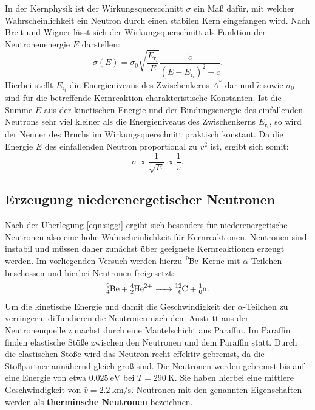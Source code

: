In der Kernphysik ist der Wirkungsquerscchnitt $\sigma$ ein Maß dafür, mit welcher Wahrscheinlichkeit ein Neutron durch einen stabilen Kern eingefangen wird.
Nach Breit und Wigner lässt sich der Wirkungsquerschnitt als Funktion der Neutronenenergie $E$ darstellen:
\begin{equation}
  \sigma (E)=\sigma _0 \sqrt{\frac{E_{\mathrm{r}_i}}{E}}\frac{\tilde{c}}{\left(E-E_{\mathrm{r}_i}\right)^2 +\tilde{c}} \text{.}
\end{equation}
Hierbei stellt $E_{\mathrm{r}_i}$ die Energieniveaus des Zwischenkerns $A^{*}$ dar und $\tilde{c}$ sowie $\sigma_0$ sind für die betreffende Kernreaktion charakteristische Konstanten.
Ist die Summe $E$ aus der kinetischen Energie und der Bindungsenergie des einfallenden Neutrons sehr viel kleiner als die Energieniveaus des Zwischenkerns $E_{\mathrm{r}_i}$, so wird der Nenner des Bruchs im Wirkungsquerschnitt praktisch konstant. Da die Energie $E$ des einfallenden Neutron proportional zu $v^2$ ist, ergibt sich somit:
\begin{equation}
  \label{eqn:siggi}
  \sigma \propto \frac{1}{\sqrt{E}}\propto \frac{1}{v} \text{.}
\end{equation}

\subsection{Erzeugung niederenergetischer Neutronen}
Nach der Überlegung \ref{eqn:siggi} ergibt sich besonders für niederenergetische Neutronen also eine hohe Wahrscheinlichkeit für Kernreaktionen.
Neutronen sind instabil und müssen daher zunächst über geeignete Kernreaktionen erzeugt werden.
Im vorliegenden Versuch werden hierzu $\ce{^{9}Be}$-Kerne mit $\alpha$-Teilchen beschossen und hierbei Neutronen freigesetzt:
\begin{align}
    \ce{ ^{9}_4Be + ^{4}_2He^{2+}  -> ^{12}_6C + ^{1}_0n}\text{.}
\end{align}
Um die kinetische Energie und damit die Geschwindigkeit der $\alpha$-Teilchen zu verringern, diffundieren die Neutronen nach dem Austritt aus der Neutronenquelle zunächst durch eine Mantelschicht aus Paraffin. Im Paraffin finden elastische Stöße zwischen den Neutronen und dem Paraffin statt. Durch die elastischen Stöße wird das Neutron recht effektiv gebremst, da die Stoßpartner annähernd gleich groß sind.
Die Neutronen werden gebremst bis auf eine Energie von etwa $\SI{0.025}{\electronvolt}$ bei $T=\SI{290}{\kelvin}$. Sie haben hierbei eine mittlere Geschwindigkeit von $\bar{v}=\SI{2.2}{\kilo\meter\per\second}$. Neutronen mit den genannten Eigenschaften werden als \textbf{therminsche Neutronen} bezeichnen.

